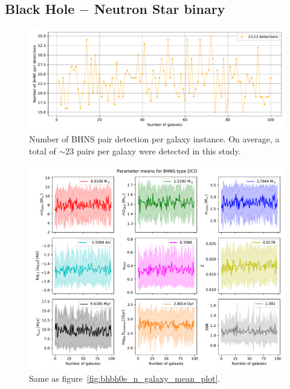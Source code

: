 \subsection{Black Hole $-$ Neutron Star binary}
\begin{figure}[!h]
    \centering
    \includegraphics[width=\columnwidth]{analysis_data/004__images_for_latex/BHNS0e_n_detections}
    \caption{Number of BHNS pair detection per galaxy instance. On average, a total of $\sim$23 pairs per galaxy were detected in this study.}
    \label{fig:bhns0endetections}
\end{figure}

\begin{figure}[!h]
    \centering
    \includegraphics[width=\columnwidth]{analysis_data/004__images_for_latex/BHNS0e_n_galaxy_mean_plot}
    \caption{Same as figure~\ref{fig:bhbh0e_n_galaxy_mean_plot}.}
    \label{fig:bhns0e_n_galaxy_mean_plot}
\end{figure}

